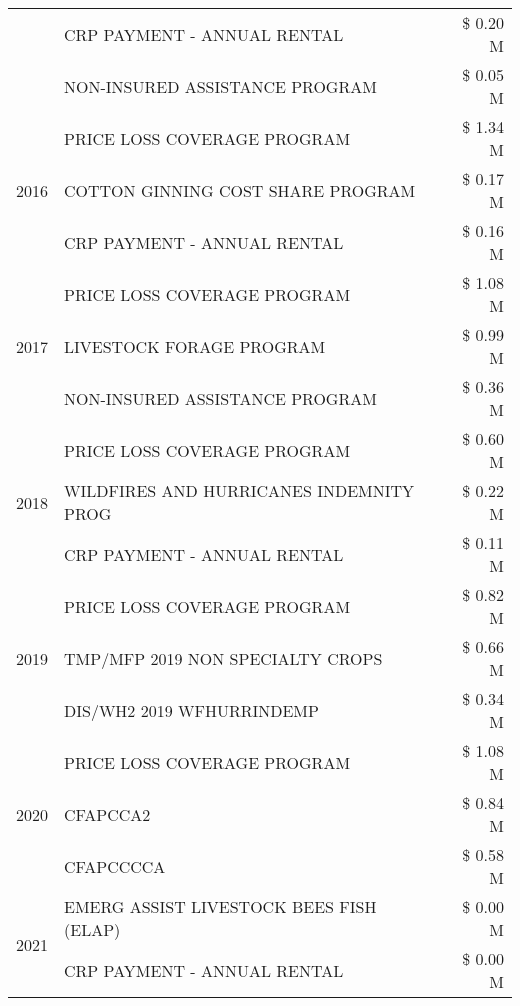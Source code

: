 \begin{tabular}{llr}
 & CRP PAYMENT - ANNUAL RENTAL & \$ 0.20 M \\
 & NON-INSURED ASSISTANCE PROGRAM & \$ 0.05 M \\
\cline{1-3}
\multirow[t]{3}{*}{2016} & PRICE LOSS COVERAGE PROGRAM                   & \$ 1.34 M \\
 & COTTON GINNING COST SHARE PROGRAM             & \$ 0.17 M \\
 & CRP PAYMENT - ANNUAL RENTAL                   & \$ 0.16 M \\
\cline{1-3}
\multirow[t]{3}{*}{2017} & PRICE LOSS COVERAGE PROGRAM & \$ 1.08 M \\
 & LIVESTOCK FORAGE PROGRAM & \$ 0.99 M \\
 & NON-INSURED ASSISTANCE PROGRAM & \$ 0.36 M \\
\cline{1-3}
\multirow[t]{3}{*}{2018} & PRICE LOSS COVERAGE PROGRAM & \$ 0.60 M \\
 & WILDFIRES AND HURRICANES INDEMNITY PROG & \$ 0.22 M \\
 & CRP PAYMENT - ANNUAL RENTAL & \$ 0.11 M \\
\cline{1-3}
\multirow[t]{3}{*}{2019} & PRICE LOSS COVERAGE PROGRAM & \$ 0.82 M \\
 & TMP/MFP 2019 NON SPECIALTY CROPS & \$ 0.66 M \\
 & DIS/WH2 2019 WFHURRINDEMP & \$ 0.34 M \\
\cline{1-3}
\multirow[t]{3}{*}{2020} & PRICE LOSS COVERAGE PROGRAM & \$ 1.08 M \\
 & CFAPCCA2 & \$ 0.84 M \\
 & CFAPCCCCA & \$ 0.58 M \\
\cline{1-3}
\multirow[t]{2}{*}{2021} & EMERG ASSIST LIVESTOCK BEES FISH (ELAP) & \$ 0.00 M \\
 & CRP PAYMENT - ANNUAL RENTAL & \$ 0.00 M \\
\cline{1-3}
\bottomrule
\end{tabular}
